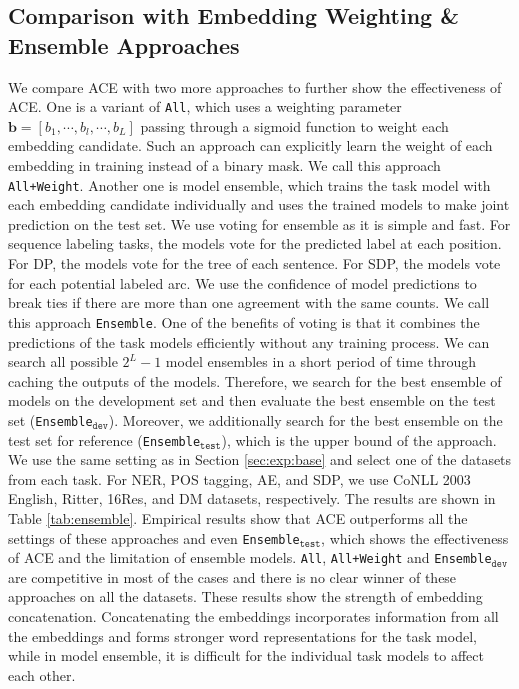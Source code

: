 \documentclass[11pt,a4paper]{article}
\def\vb{{\bm{b}}}
\begin{document}
\subsection{Comparison with Embedding Weighting \& Ensemble Approaches}
\label{sec:ensemble}
We compare ACE with two more approaches to further show the effectiveness of ACE. One is a variant of \texttt{All}, which uses a weighting parameter $\vb=[b_1, \cdots, b_l, \cdots, b_L]$ passing through a sigmoid function to weight each embedding candidate. Such an approach can explicitly learn the weight of each embedding in training instead of a binary mask. We call this approach \texttt{All+Weight}. Another one is model ensemble, which trains the task model with each embedding candidate individually and uses the trained models to make joint prediction on the test set. We use voting for ensemble as it is simple and fast. For sequence labeling tasks, the models vote for the predicted label at each position. For DP, the models vote for the tree of each sentence. For SDP, the models vote for each potential labeled arc. We use the confidence of model predictions to break ties if there are more than one agreement with the same counts. We call this approach \texttt{Ensemble}. One of the benefits of voting is that it combines the predictions of the task models efficiently without any training process. We can search all possible $2^L{-}1$ model ensembles in a short period of time through caching the outputs of the models. Therefore, we search for the best ensemble of models on the development set and then evaluate the best ensemble on the test set (\texttt{Ensemble$_{\texttt{dev}}$}). Moreover, we additionally search for the best ensemble on the test set for reference (\texttt{Ensemble$_{\texttt{test}}$}), which is the upper bound of the approach. We use the same setting as in Section \ref{sec:exp:base} and select one of the datasets from each task. For NER, POS tagging, AE, and SDP, we use CoNLL 2003 English, Ritter, 16Res, and DM datasets, respectively. The results are shown in Table \ref{tab:ensemble}. Empirical results show that ACE outperforms all the settings of these approaches and even \texttt{Ensemble$_\texttt{test}$}, which shows the effectiveness of ACE and the limitation of ensemble models. \texttt{All}, \texttt{All+Weight} and \texttt{Ensemble$_\texttt{dev}$} are competitive in most of the cases and there is no clear winner of these approaches on all the datasets. These results show the strength of embedding concatenation. Concatenating the embeddings incorporates information from all the embeddings and forms stronger word representations for the task model, while in model ensemble, it is difficult for the individual task models to affect each other.
\end{document}
